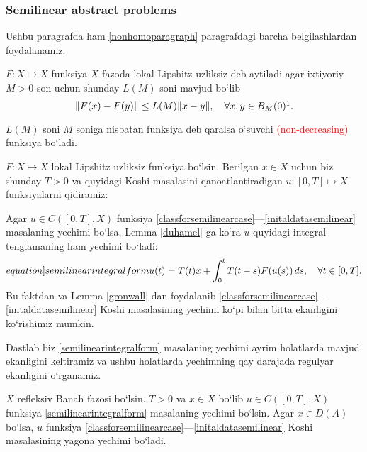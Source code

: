 \subsubsection{Semilinear abstract problems}
Ushbu paragrafda ham \ref{nonhomoparagraph} paragrafdagi barcha belgilashlardan foydalanamiz.
\begin{definition}
    $F\colon X\mapsto X$ funksiya $X$ fazoda lokal Lipshitz uzliksiz deb aytiladi agar ixtiyoriy $M>0$ son uchun shunday $L(M)$ soni mavjud bo`lib 
    \begin{equation*}
        \lVert F(x)-F(y)\rVert\le L(M)\lVert x-y\rVert, \quad \forall x,y\in B_M(0)\footnotemark.
    \end{equation*}
\end{definition}
\vspace{-0.85cm}
\begin{remark}
    $L(M)$ soni $M$ soniga nisbatan funksiya deb qaralsa o`suvchi \textcolor{red}{(non-decreasing)} funksiya bo`ladi.
\end{remark}
 $F\colon X\mapsto X$ lokal Lipshitz uzliksiz funksiya bo`lsin. Berilgan $x\in X$ uchun biz shunday $T>0$ va quyidagi Koshi masalasini qa\-no\-at\-lan\-ti\-ra\-di\-gan $u\colon [0,T]\mapsto X$ funksiyalarni qidiramiz:
 \begin{remark}
    Agar $u\in C\left([0,T], X\right)$ funksiya \eqref{classforsemilinearcase}---\eqref{initaldatasemilinear} masalaning yechimi bo`lsa,  Lemma \ref{duhamel} ga ko`ra $u$ quyidagi integral tenglamaning ham yechimi bo`ladi:
    \begin{equation}\label[equation]{semilinearintegralform}
        u(t)=T(t)x+\int_0^t T(t-s)F(u(s))\,ds, \quad \forall t\in[0,T].
    \end{equation}
Bu faktdan va Lemma \ref{gronwall} dan foydalanib \eqref{classforsemilinearcase}---\eqref{initaldatasemilinear} Koshi masalasining yechimi ko`pi bilan bitta ekanligini ko`rishimiz mumkin.
 \end{remark}

 Dastlab biz \eqref{semilinearintegralform} masalaning yechimi ayrim holatlarda mavjud ekanligini keltiramiz va ushbu holatlarda yechimning qay darajada regulyar ekanligini o`rganamiz.

 \begin{theorem}
    $X$ refleksiv Banah fazosi bo`lsin. $T>0$ va $x\in X$ bo`lib $u\in C\left([0,T], X\right)$ funksiya \eqref{semilinearintegralform} masalaning yechimi bo`lsin. Agar $x\in D(A)$ bo`lsa, $u$ funksiya \eqref{classforsemilinearcase}---\eqref{initaldatasemilinear} Koshi masalasining yagona yechimi bo`ladi.
 \end{theorem}
 